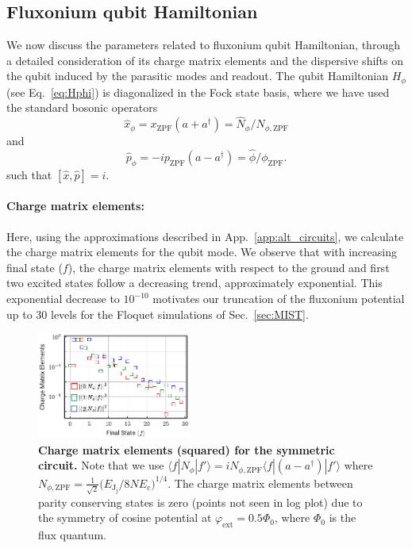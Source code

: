 \documentclass[%
reprint,
superscriptaddress,
 amsmath,amssymb,
 aps,
 prx,
longbibliography,
floatfix,
]{revtex4-2}
\newcommand{\sh}[1]{{\color{blue}{{}[SS: #1]}}}%
\begin{document}
\subsection{Fluxonium qubit Hamiltonian}\sh{Start spell check here}
We now discuss the parameters related to fluxonium qubit Hamiltonian, through a detailed consideration of its charge matrix elements and the dispersive shifts on the qubit induced by the parasitic modes and readout. The qubit Hamiltonian $H_{\phi}$ (see Eq.~\ref{eq:Hphi}) is diagonalized in the Fock state basis, where we have used the standard bosonic operators
 \begin{equation} \hat x_\phi=x_{\mathrm{ZPF}}(a+a^\dagger)=\hat N_{\phi}/ N_{\phi,\mathrm{ZPF}}
 \end{equation}
 and 
 \begin{equation} \hat p_\phi=-ip_{\mathrm{ZPF}}(a-a^\dagger)=\hat \phi/\phi_{\mathrm{ZPF}}.
 \end{equation}
such that $[\hat x,\hat p]=i$.
\paragraph{Charge matrix elements:}
Here, using the approximations described in App.~\ref{app:alt_circuits}, we calculate the charge matrix elements for the qubit mode. We observe that with increasing final state ($f$), the charge matrix elements with respect to the ground and first two excited states follow a decreasing trend, approximately exponential. This exponential decrease to $10^{-10}$ motivates our truncation of the fluxonium potential up to $30$ levels for the Floquet simulations of Sec.~\ref{sec:MIST}.
\begin{figure}[t]
    \centering
\includegraphics[width=0.45\textwidth]{Supp_Fig/Charge_Matrix.pdf}
    \caption{{\bf Charge matrix 
 elements (squared) for the symmetric circuit.} Note that we use $\langle f|N_\phi|f'\rangle=iN_{\phi,\mathrm{ZPF}}\langle f|(a-a^\dagger)|f'\rangle$ where $N_{\phi,\mathrm{ZPF}}=\frac{1}{\sqrt{2}}\Big(E_{\textrm{J}_\textrm{j}}/8NE_{\textrm{c}}\Big)^{1/4}$. The charge matrix elements between parity conserving states is zero (points not seen in log plot) due to the symmetry of cosine potential at $\varphi_\mathrm{ext}=0.5\Phi_0$, where $\Phi_0$ is the flux quantum.}
    \label{charge-matrix}
\end{figure}
\end{document}
